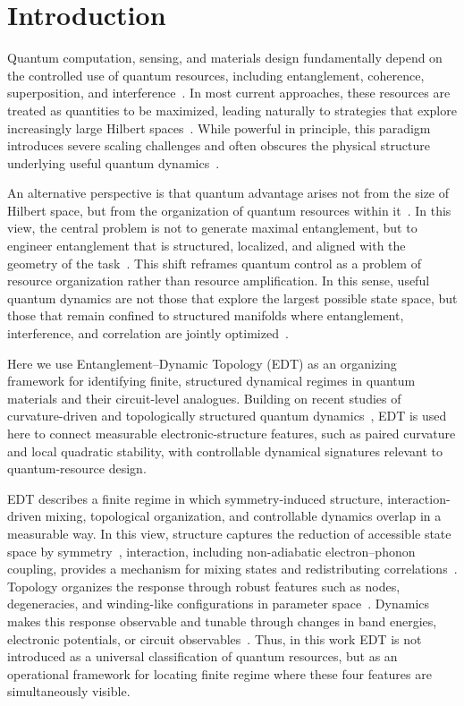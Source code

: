 \documentclass[twocolumn,10pt]{article}
\begin{document}
\section*{Introduction}


Quantum computation, sensing, and materials design fundamentally depend on the controlled use of quantum resources, including entanglement, coherence, superposition, and interference~\cite{NielsenChuang,Horodecki2009,Streltsov2017}. In most current approaches, these resources are treated as quantities to be maximized, leading naturally to strategies that explore increasingly large Hilbert spaces~\cite{Preskill2018,Arute2019}. While powerful in principle, this paradigm introduces severe scaling challenges and often obscures the physical structure underlying useful quantum dynamics~\cite{Eisert2010,Altman2015}.

An alternative perspective is that quantum advantage arises not from the size of Hilbert space, but from the organization of quantum resources within it~\cite{Amico2008,Swingle2018}. In this view, the central problem is not to generate maximal entanglement, but to engineer entanglement that is structured, localized, and aligned with the geometry of the task~\cite{Verstraete2008,Orus2014}. This shift reframes quantum control as a problem of resource organization rather than resource amplification. In this sense, useful quantum dynamics are not those that explore the largest possible state space, but those that remain confined to structured manifolds where entanglement, interference, and correlation are jointly optimized~\cite{KimHuse2013,Choi2016}.

Here we use Entanglement--Dynamic Topology (EDT) as an organizing framework for identifying finite, structured dynamical regimes in quantum materials and their circuit-level analogues. Building on recent studies of curvature-driven and topologically structured quantum dynamics~\cite{Hu2024_ACP,Hu2025_APQ,Hu2026_JPCM}, EDT is used here to connect measurable electronic-structure features, such as paired curvature and local quadratic stability, with controllable dynamical signatures relevant to quantum-resource design.

EDT describes a finite regime in which symmetry-induced structure, interaction-driven mixing, topological organization, and controllable dynamics overlap in a measurable way. In this view, structure captures the reduction of accessible state space by symmetry~\cite{Wigner1959,Georgi1999}, interaction, including non-adiabatic electron--phonon coupling, provides a mechanism for mixing states and redistributing correlations~\cite{Mead1979,Yarkony1996}. Topology organizes the response through robust features such as nodes, degeneracies, and winding-like configurations in parameter space~\cite{Berry1984,Xiao2010}. Dynamics makes this response observable and tunable through changes in band energies, electronic potentials, or circuit observables~\cite{Bukov2015,Eckardt2017}. Thus, in this work EDT is not introduced as a universal classification of quantum resources, but as an operational framework for locating finite regime where these four features are simultaneously visible.
\end{document}
